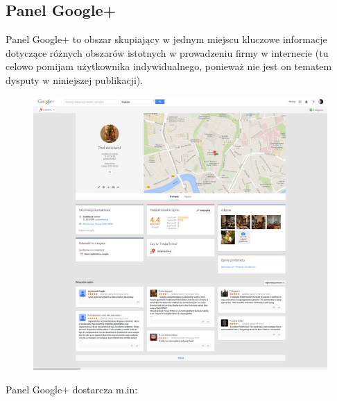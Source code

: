 
\subsection{Panel Google+}
Panel Google+ to obszar skupiający w jednym miejscu kluczowe informacje dotyczące różnych obszarów istotnych w prowadzeniu firmy w internecie (tu celowo pomijam użytkownika indywidualnego, ponieważ nie jest on tematem dysputy w niniejszej publikacji).\\

\begin{figure}[!h]
\centering
    \scalebox{0.21}
    {
        \includegraphics{images/pod-aniolami-google-plus.png}
    }
    \label{fig:sample-google-plus-company-profile-page}
\end{figure}

Panel Google+ dostarcza m.in:

